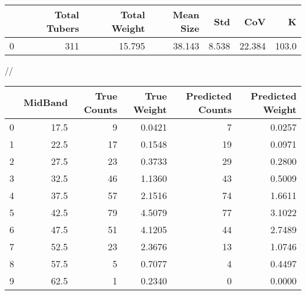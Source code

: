 \begin{tabular}{lrrrrrr}
\toprule
{} &  Total Tubers &  Total Weight &  Mean Size &    Std &     CoV &      K \\
\midrule
0 &           311 &        15.795 &     38.143 &  8.538 &  22.384 &  103.0 \\
\bottomrule
\end{tabular}
//\begin{tabular}{lrrrrr}
\toprule
{} &  MidBand &  True Counts &  True Weight &  Predicted Counts &  Predicted Weight \\
\midrule
0 &     17.5 &            9 &       0.0421 &                 7 &            0.0257 \\
1 &     22.5 &           17 &       0.1548 &                19 &            0.0971 \\
2 &     27.5 &           23 &       0.3733 &                29 &            0.2800 \\
3 &     32.5 &           46 &       1.1360 &                43 &            0.5009 \\
4 &     37.5 &           57 &       2.1516 &                74 &            1.6611 \\
5 &     42.5 &           79 &       4.5079 &                77 &            3.1022 \\
6 &     47.5 &           51 &       4.1205 &                44 &            2.7489 \\
7 &     52.5 &           23 &       2.3676 &                13 &            1.0746 \\
8 &     57.5 &            5 &       0.7077 &                 4 &            0.4497 \\
9 &     62.5 &            1 &       0.2340 &                 0 &            0.0000 \\
\bottomrule
\end{tabular}
